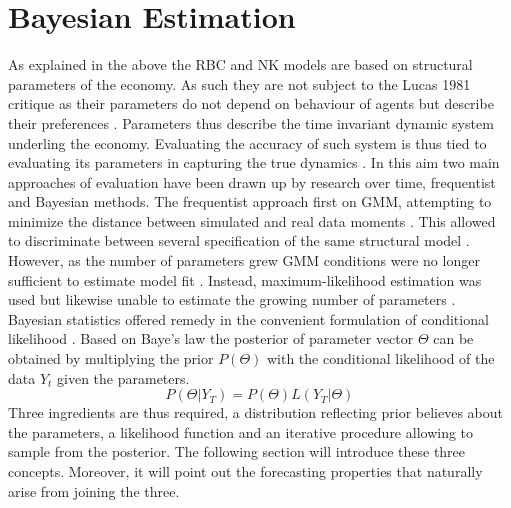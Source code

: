 \documentclass[12pt,a4paper,english]{article} %
\let\oldsection\section
\renewcommand\section{\clearpage\oldsection}
\begin{document}
	\section{Bayesian Estimation}
	As explained in the above the RBC and NK models are based on structural parameters of the economy. As such they are not subject to the Lucas 1981 critique as their parameters do not depend on behaviour of agents but describe their preferences \cite{lucas_jr_tobin_1981}. Parameters thus describe the time invariant dynamic system underling the economy. Evaluating the accuracy of such system is thus tied to evaluating its parameters in capturing the true dynamics \cite{herbst_bayesian_2016}. In this aim two main approaches of evaluation have been drawn up by research over time, frequentist and Bayesian methods. 
	The frequentist approach first on \ac{GMM}, attempting to minimize the distance between simulated and real data moments \cite{blanchard_solution_1980}. This allowed to discriminate between several specification of the same structural model \cite{christiano_current_1992}. However, as the number of parameters grew GMM conditions were no longer sufficient to estimate model fit \cite{guerron-quintana_bayesian_2013}. Instead, maximum-likelihood  estimation was used but likewise unable to estimate the growing number of parameters \cite{guerron-quintana_bayesian_2013}. Bayesian statistics offered remedy in the convenient formulation of conditional likelihood \cite{guerron-quintana_bayesian_2013}. Based on Baye's law the posterior of parameter vector $\Theta$ can be obtained by multiplying the prior $P(\Theta)$ with the conditional likelihood of the data $Y_t$ given the parameters. 
	\begin{equation} \label{eq:blaw}
		P( \Theta | Y_{T}) = P(\Theta) L(Y_{T} | \Theta)
	\end{equation}
	Three ingredients are thus required, a distribution reflecting prior believes about the parameters, a likelihood function and an iterative procedure allowing to sample from the posterior. The following section will introduce these three concepts. Moreover, it will point out the forecasting properties that naturally arise from joining the three. 
		
\end{document}
